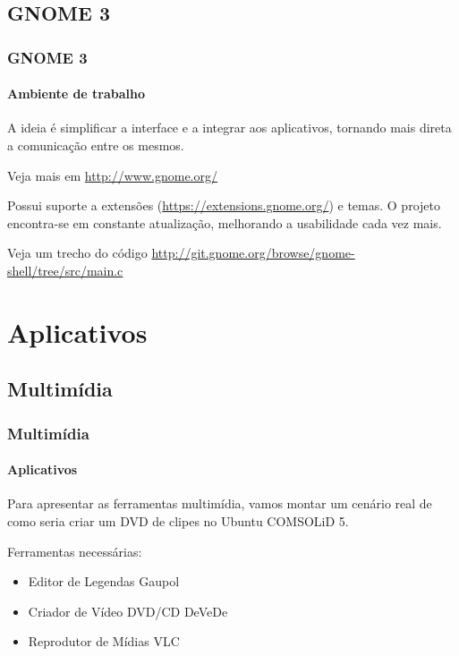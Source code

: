 \subsection{GNOME 3}

\begin{frame}


\end{frame}

\begin{frame}\frametitle{GNOME 3}\framesubtitle{Ambiente de trabalho}

A ideia é simplificar a interface e a integrar aos aplicativos, tornando mais direta
a comunicação entre os mesmos.

\medskip

Veja mais em \url{http://www.gnome.org/}

\medskip

Possui suporte a extensões (\url{https://extensions.gnome.org/}) e temas.
O projeto encontra-se em constante atualização, melhorando a usabilidade cada vez mais.

\medskip

Veja um trecho do código \url{http://git.gnome.org/browse/gnome-shell/tree/src/main.c}

\end{frame}

\section{Aplicativos}

\begin{frame}


\end{frame}

\subsection{Multimídia}

\begin{frame}


\end{frame}

\begin{frame}\frametitle{Multimídia}\framesubtitle{Aplicativos}

Para apresentar as ferramentas multimídia, vamos montar um cenário real de como
seria criar um DVD de clipes no Ubuntu COMSOLiD 5.

Ferramentas necessárias:
\begin{itemize}
	\item Editor de Legendas Gaupol
	\item Criador de Vídeo DVD/CD DeVeDe
	\item Reprodutor de Mídias VLC
\end{itemize}

\end{frame}

